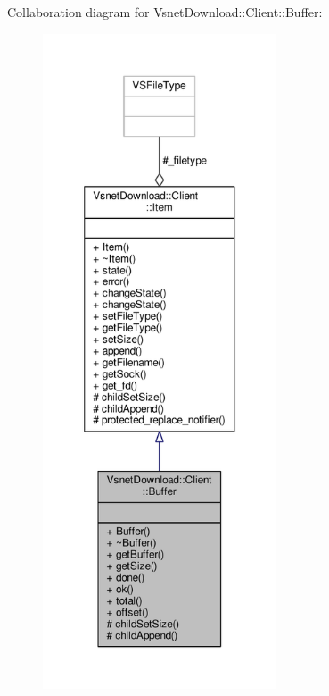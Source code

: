 Collaboration diagram for Vsnet\+Download\+:\+:Client\+:\+:Buffer\+:
\nopagebreak
\begin{figure}[H]
\begin{center}
\leavevmode
\includegraphics[height=550pt]{d9/d20/classVsnetDownload_1_1Client_1_1Buffer__coll__graph}
\end{center}
\end{figure}
